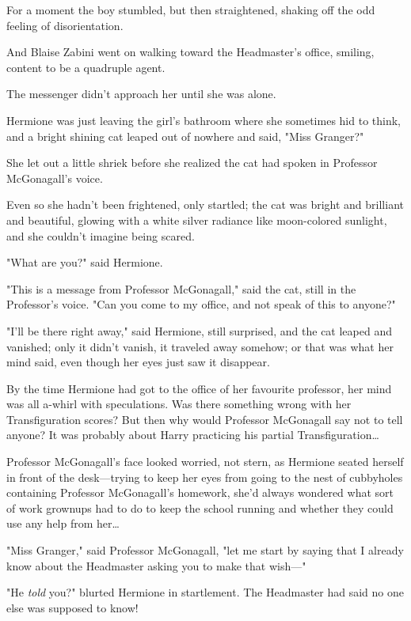 For a moment the boy stumbled, but then straightened, shaking off the odd
feeling of disorientation.

And Blaise Zabini went on walking toward the Headmaster's office, smiling,
content to be a quadruple agent.

The messenger didn't approach her until she was alone.

Hermione was just leaving the girl's bathroom where she sometimes hid to think,
and a bright shining cat leaped out of nowhere and said, "Miss Granger?"

She let out a little shriek before she realized the cat had spoken in Professor
McGonagall's voice.

Even so she hadn't been frightened, only startled; the cat was bright and
brilliant and beautiful, glowing with a white silver radiance like moon-colored
sunlight, and she couldn't imagine being scared.

"What are you?" said Hermione.

"This is a message from Professor McGonagall," said the cat, still in the
Professor's voice. "Can you come to my office, and not speak of this to anyone?"

"I'll be there right away," said Hermione, still surprised, and the cat leaped
and vanished; only it didn't vanish, it traveled away somehow; or that was what
her mind said, even though her eyes just saw it disappear.

By the time Hermione had got to the office of her favourite professor, her mind
was all a-whirl with speculations. Was there something wrong with her
Transfiguration scores? But then why would Professor McGonagall say not to tell
anyone? It was probably about Harry practicing his partial
Transfiguration{\ldots}

Professor McGonagall's face looked worried, not stern, as Hermione seated
herself in front of the desk---trying to keep her eyes from going to the nest
of cubbyholes containing Professor McGonagall's homework, she'd always wondered
what sort of work grownups had to do to keep the school running and whether
they could use any help from her{\ldots}

"Miss Granger," said Professor McGonagall, "let me start by saying that I
already know about the Headmaster asking you to make that wish---"

"He \emph{told} you?" blurted Hermione in startlement. The Headmaster had said
no one else was supposed to know!

